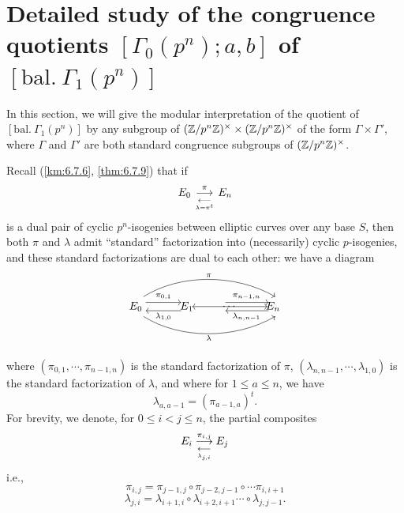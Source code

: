 \section{Detailed study of the congruence quotients $[\Gamma_0(p^n); a, b]$ of $[\mathrm{bal.}\ \Gamma_1(p^n)]$}
\label{sec:7.9}

\kmitem\label{item:7.9.1}
In this section, we will give the modular interpretation of the quotient of $[\mathrm{bal.}\ \Gamma_1(p^n)]$ by any subgroup of $(\mathbb{Z}/p^n\mathbb{Z})^\times \times (\mathbb{Z}/p^n\mathbb{Z})^\times$ of the form $\Gamma \times \Gamma'$, where $\Gamma$ and $\Gamma'$ are both standard congruence subgroups of $(\mathbb{Z}/p^n\mathbb{Z})^\times$.

Recall (\ref{km:6.7.6}, \ref{thm:6.7.9}) that if
\begin{equation}\label{eq:7.9.1.1}
E_0 \mathrel{ \mathop{\overset{\,\pi\,}{\longrightarrow}} \limits_{\underset{\,\lambda = \pi^t\,}{\longleftarrow}} } E_n
\end{equation}
is a dual pair of cyclic $p^n$-isogenies between elliptic curves over any base $S$, then both $\pi$ and $\lambda$ admit ``standard'' factorization into (necessarily) cyclic $p$-isogenies, and these standard factorizations are dual to each other: we have a diagram
\begin{equation}\label{eq:7.9.1.2}
\begin{tikzpicture}[x=1em, y=1em, every node/.style={inner sep=1pt}]
\node (E0) at (0,0) {$E_0$};
\node (E1) at (4.6,0) {$E_1$};
\node (En) at (12.4,0) {$E_n$};
\node (Ed) at (8.5,0) {$\cdots$};
\draw[->] (0.9,0.38) -- (4.1,0.38);
\node at (2.5,0.92) {\scriptsize $\pi_{0,1}$};
\draw[->] (4.1,-0.38) -- (0.9,-0.38);
\node at (2.5,-0.92) {\scriptsize $\lambda_{1,0}$};
\draw[<->] (5.1,0) -- (11.9,0);
\draw[->] (8.1,0.38) -- (12.0,0.38);
\node at (10.0,0.92) {\scriptsize $\pi_{n-1,n}$};
\draw[->] (12.0,-0.38) -- (8.1,-0.38);
\node at (10.0,-0.92) {\scriptsize $\lambda_{n,n-1}$};
\draw[->] (0.7,0.9) .. controls (4.0,3.0) and (9.0,3.0) .. (12.6,0.9);
\node at (6.6,2.85) {\scriptsize $\pi$};
\draw[->] (0.7,-0.9) .. controls (4.0,-3.0) and (9.0,-3.0) .. (12.6,-0.9);
\node at (6.6,-2.85) {\scriptsize $\lambda$};
\end{tikzpicture}
\end{equation}
\addtocounter{equation}{1}%
where $(\pi_{0,1},\cdots,\pi_{n-1,n})$ is the standard factorization of $\pi$, $(\lambda_{n,n-1},\cdots,\lambda_{1,0})$ is the standard factorization of $\lambda$, and where for $1 \leq a \leq n$, we have
\begin{equation}\label{eq:7.9.1.4}
\lambda_{a,a-1} = (\pi_{a-1,a})^t .
\end{equation}
For brevity, we denote, for $0 \leq i < j \leq n$, the partial composites
\begin{equation}\label{eq:7.9.1.5}
E_i \mathrel{ \mathop{\overset{\,\pi_{i,j}\,}{\longrightarrow}} \limits_{\underset{\,\lambda_{j,i}\,}{\longleftarrow}} } E_j
\end{equation}
i.e.,
\[
\pi_{i,j} = \pi_{j-1,j} \circ \pi_{j-2,j-1} \circ \cdots \pi_{i,i+1}
\]
\[
\lambda_{j,i} = \lambda_{i+1,i} \circ \lambda_{i+2,i+1} \cdots \circ \lambda_{j,j-1} .
\]

